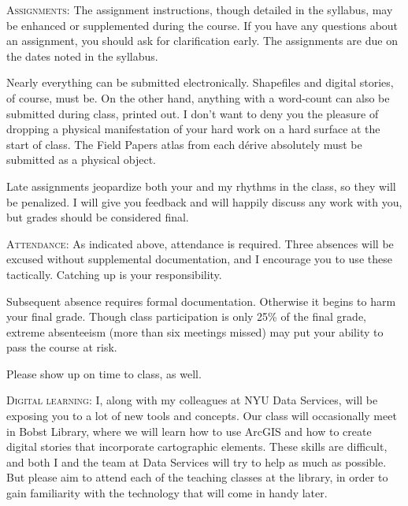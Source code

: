 \begin{description}

  \item \textsc{Assignments:} The assignment instructions, though detailed in
    the syllabus, may be enhanced or supplemented during the course. If you
    have any questions about an assignment, you should ask for clarification
    early. The assignments are due on the dates noted in the syllabus. 
    
    Nearly everything can be submitted electronically. Shapefiles and digital
    stories, of course, must be. On the other hand, anything with a word-count
    can also be submitted during class, printed out. I don’t want to deny you
    the pleasure of dropping a physical manifestation of your hard work on a
    hard surface at the start of class. The Field Papers atlas from each dérive
    absolutely must be submitted as a physical object. 
    
    Late assignments jeopardize both your and my rhythms in the class, so they
    will be penalized. I will give you feedback and will happily discuss any
    work with you, but grades should be considered final.

  \item \textsc{Attendance:} As indicated above, attendance is required. Three
    absences will be excused without supplemental documentation, and I
    encourage you to use these tactically. Catching up is your responsibility.

    Subsequent absence requires formal documentation. Otherwise it begins to
    harm your final grade. Though class participation is only 25\% of the final
    grade, extreme absenteeism (more than six meetings missed) may put your
    ability to pass the course at risk.

    Please show up on time to class, as well.

  \item \textsc{Digital learning:} I, along with my colleagues at NYU Data
    Services, will be exposing you to a lot of new tools and concepts. Our
    class will occasionally meet in Bobst Library, where we will learn how to
    use ArcGIS and how to create digital stories that incorporate cartographic
    elements. These skills are difficult, and both I and the team at Data
    Services will try to help as much as possible. But please aim to attend
    each of the teaching classes at the library, in order to gain familiarity
    with the technology that will come in handy later.


\end{description}
